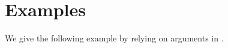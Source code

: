 \documentclass[10pt]{amsart}
\def\Xint#1{\mathchoice
	{\XXint\displaystyle\textstyle{#1}}
	{\XXint\textstyle\scriptstyle{#1}}
	{\XXint\scriptstyle\scriptscriptstyle{#1}}
	{\XXint\scriptscriptstyle\scriptscriptstyle{#1}}
	\!\int}
\def\XXint#1#2#3{{\setbox0=\hbox{$#1{#2#3}{\int}$ }
		\vcenter{\hbox{$#2#3$ }}\kern-.6\wd0}}
\def\dashint{\Xint-}
\numberwithin{equation}{section}
\begin{document}
 












\section{Examples}
We give the following example by relying  on arguments in \cite{KN22,EKN22,KNW22,K22}.
\end{document}

